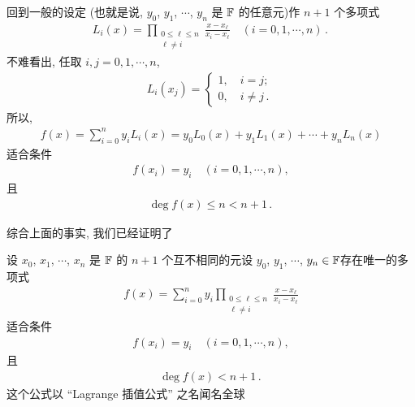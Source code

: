 回到一般的设定 (也就是说, $y_0$, $y_1$, $\cdots$, $y_n$ 是 $\mathbb{F}$ 的任意元)\period 作 $n+1$ 个多项式
\begin{align*}
    L_{i} (x) = \prod_{\begin{smallmatrix}0 \leq \ell \leq n \\\ell \neq i\end{smallmatrix}} \frac{x - x_\ell}{x_i - x_\ell} \quad (i = 0,1,\cdots,n) \period
\end{align*}
不难看出, 任取 $i,j = 0,1,\cdots,n$,
\begin{align*}
    L_{i} (x_j) = \begin{cases}
        1, \quad i = j; \\
        0, \quad i \neq j \period
    \end{cases}
\end{align*}
所以,
\begin{align*}
    f(x) = \sum_{i = 0}^{n} y_i L_{i} (x) = y_0 L_0 (x) + y_1 L_1 (x) + \cdots + y_n L_n (x)
\end{align*}
适合条件
\begin{align*}
    f(x_i) = y_i \quad (i = 0,1,\cdots,n),
\end{align*}
且
\begin{align*}
    \deg f(x) \leq n < n + 1 \period
\end{align*}

综合上面的事实, 我们已经证明了

\begin{proposition}
    设 $x_0$, $x_1$, $\cdots$, $x_{n}$ 是 $\mathbb{F}$ 的 $n+1$ 个互不相同的元\period 设 $y_0$, $y_1$, $\cdots$, $y_{n} \in \mathbb{F}$\period 存在唯一的多项式
    \begin{align*}
        f(x) = \sum_{i = 0}^{n} y_i \prod_{\begin{smallmatrix}0 \leq \ell \leq n \\\ell \neq i\end{smallmatrix}} \frac{x - x_\ell}{x_i - x_\ell}
    \end{align*}
    适合条件
    \begin{align*}
        f(x_i) = y_i \quad (i = 0,1,\cdots,n),
    \end{align*}
    且
    \begin{align*}
        \deg f(x) < n + 1 \period
    \end{align*}
    这个公式以 ``Lagrange 插值公式''  之名闻名全球\period
\end{proposition}

